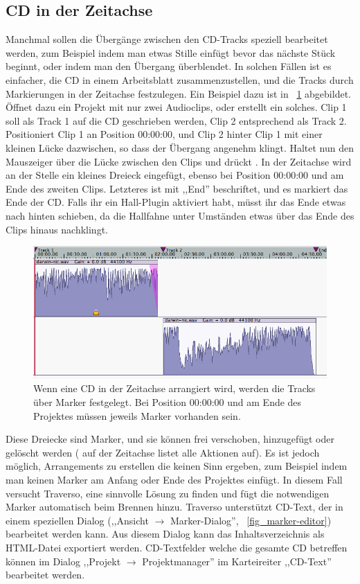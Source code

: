 \subsection{CD in der Zeitachse}
Manchmal sollen die Übergänge zwischen den CD-Tracks speziell bearbeitet werden, zum Beispiel indem man etwas Stille einfügt bevor das nächste Stück beginnt, oder indem man den Übergang überblendet. In solchen Fällen ist es einfacher, die CD in einem Arbeitsblatt zusammenzustellen, und die Tracks durch Markierungen in der Zeitachse festzulegen. Ein Beispiel dazu ist in \FigT~\ref{fig_markers01} abgebildet. Öffnet dazu ein Projekt mit nur zwei Audioclips, oder erstellt ein solches. Clip 1 soll als Track 1 auf die CD geschrieben werden, Clip 2 entsprechend als Track 2. Positioniert Clip 1 an Position 00:00:00, und Clip 2 hinter Clip 1 mit einer kleinen Lücke dazwischen, so dass der Übergang angenehm klingt. Haltet nun den Mauszeiger über die Lücke zwischen den Clips und drückt . In der Zeitachse wird an der Stelle ein kleines Dreieck eingefügt, ebenso bei Position 00:00:00 und am Ende des zweiten Clips. Letzteres ist mit ,,End'' beschriftet, und es markiert das Ende der CD. Falls ihr ein Hall-Plugin aktiviert habt, müsst ihr das Ende etwas nach hinten schieben, da die Hallfahne unter Umständen etwas über das Ende des Clips hinaus nachklingt.

\begin{figure}[t]
 \centering\includegraphics[width=\textwidth]{images/markers01}
 \caption{Wenn eine CD in der Zeitachse arrangiert wird, werden die Tracks über Marker festgelegt. Bei Position 00:00:00 und am Ende des Projektes müssen jeweils Marker vorhanden sein.}
 \label{fig_markers01}
\end{figure}

Diese Dreiecke sind Marker, und sie können frei verschoben, hinzugefügt oder gelöscht werden ( auf der Zeitachse listet alle Aktionen auf). Es ist jedoch möglich, Arrangements zu erstellen die keinen Sinn ergeben, zum Beispiel indem man keinen Marker am Anfang oder Ende des Projektes einfügt. In diesem Fall versucht Traverso, eine sinnvolle Lösung zu finden und fügt die notwendigen Marker automatisch beim Brennen hinzu. Traverso unterstützt CD-Text, der in einem speziellen Dialog (,,Ansicht $\rightarrow$ Marker-Dialog'', \FigT~\ref{fig_marker-editor}) bearbeitet werden kann. Aus diesem Dialog kann das Inhaltsverzeichnis als HTML-Datei exportiert werden. CD-Textfelder welche die gesamte CD betreffen können im Dialog ,,Projekt $\rightarrow$ Projektmanager'' im Karteireiter ,,CD-Text'' bearbeitet werden.

